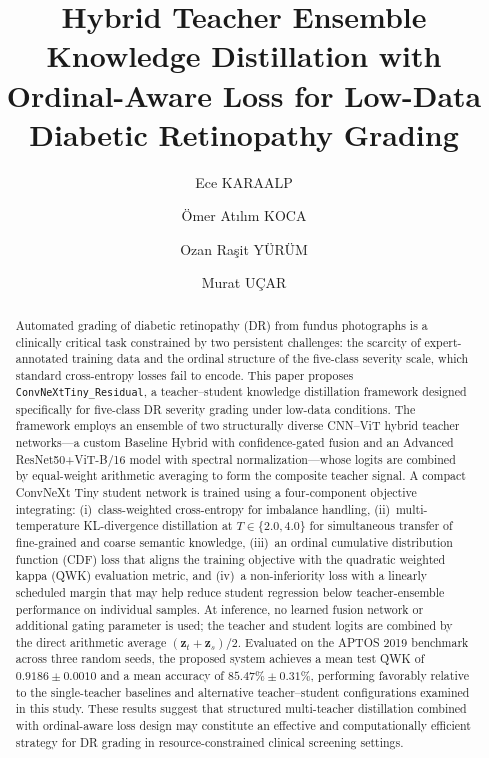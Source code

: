 \documentclass[a4paper,fleqn]{cas-dc}
\begin{document}
\sloppy
\let\WriteBookmarks\relax
\def\floatpagepagefraction{1}
\def\textpagefraction{.001}

\title[mode=title]{Hybrid Teacher Ensemble Knowledge Distillation with Ordinal-Aware Loss for Low-Data Diabetic Retinopathy Grading}

\author[1]{Ece KARAALP}
\author[1]{Ömer Atılım KOCA}
\author[2]{Ozan Raşit YÜRÜM}
\author[2]{Murat UÇAR}
\cormark[1]
\address[1]{Department of Computer Engineering, Izmir Bakircay University, Izmir, Turkey}
\address[2]{Department, University, City, Country}

\begin{abstract}
Automated grading of diabetic retinopathy (DR) from fundus photographs is a clinically critical task constrained by two persistent challenges: the scarcity of expert-annotated training data and the ordinal structure of the five-class severity scale, which standard cross-entropy losses fail to encode. This paper proposes \texttt{ConvNeXtTiny\_Residual}, a teacher--student knowledge distillation framework designed specifically for five-class DR severity grading under low-data conditions. The framework employs an ensemble of two structurally diverse CNN--ViT hybrid teacher networks---a custom Baseline Hybrid with confidence-gated fusion and an Advanced ResNet50+ViT-B/16 model with spectral normalization---whose logits are combined by equal-weight arithmetic averaging to form the composite teacher signal. A compact ConvNeXt Tiny student network is trained using a four-component objective integrating: (i)~class-weighted cross-entropy for imbalance handling, (ii)~multi-temperature KL-divergence distillation at $T \in \{2.0, 4.0\}$ for simultaneous transfer of fine-grained and coarse semantic knowledge, (iii)~an ordinal cumulative distribution function (CDF) loss that aligns the training objective with the quadratic weighted kappa (QWK) evaluation metric, and (iv)~a non-inferiority loss with a linearly scheduled margin that may help reduce student regression below teacher-ensemble performance on individual samples. At inference, no learned fusion network or additional gating parameter is used; the teacher and student logits are combined by the direct arithmetic average $(\mathbf{z}_t+\mathbf{z}_s)/2$. Evaluated on the APTOS 2019 benchmark across three random seeds, the proposed system achieves a mean test QWK of $\mathbf{0.9186 \pm 0.0010}$ and a mean accuracy of $\mathbf{85.47\% \pm 0.31\%}$, performing favorably relative to the single-teacher baselines and alternative teacher--student configurations examined in this study. These results suggest that structured multi-teacher distillation combined with ordinal-aware loss design may constitute an effective and computationally efficient strategy for DR grading in resource-constrained clinical screening settings.
\end{abstract}
\end{document}
